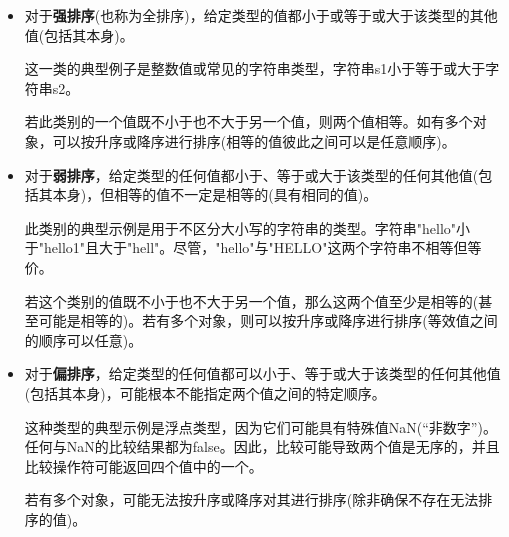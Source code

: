 \begin{itemize}
\item
对于\textbf{强排序}(也称为全排序)，给定类型的值都小于或等于或大于该类型的其他值(包括其本身)。

这一类的典型例子是整数值或常见的字符串类型，字符串s1小于等于或大于字符串s2。

若此类别的一个值既不小于也不大于另一个值，则两个值相等。如有多个对象，可以按升序或降序进行排序(相等的值彼此之间可以是任意顺序)。

\item
对于\textbf{弱排序}，给定类型的任何值都小于、等于或大于该类型的任何其他值(包括其本身)，但相等的值不一定是相等的(具有相同的值)。

此类别的典型示例是用于不区分大小写的字符串的类型。字符串"hello"小于"hello1"且大于"hell"。尽管，"hello"与"HELLO"这两个字符串不相等但等价。

若这个类别的值既不小于也不大于另一个值，那么这两个值至少是相等的(甚至可能是相等的)。若有多个对象，则可以按升序或降序进行排序(等效值之间的顺序可以任意)。

\item
对于\textbf{偏排序}，给定类型的任何值都可以小于、等于或大于该类型的任何其他值(包括其本身)，可能根本不能指定两个值之间的特定顺序。

这种类型的典型示例是浮点类型，因为它们可能具有特殊值NaN(“非数字”)。任何与NaN的比较结果都为false。因此，比较可能导致两个值是无序的，并且比较操作符可能返回四个值中的一个。

若有多个对象，可能无法按升序或降序对其进行排序(除非确保不存在无法排序的值)。
\end{itemize}


